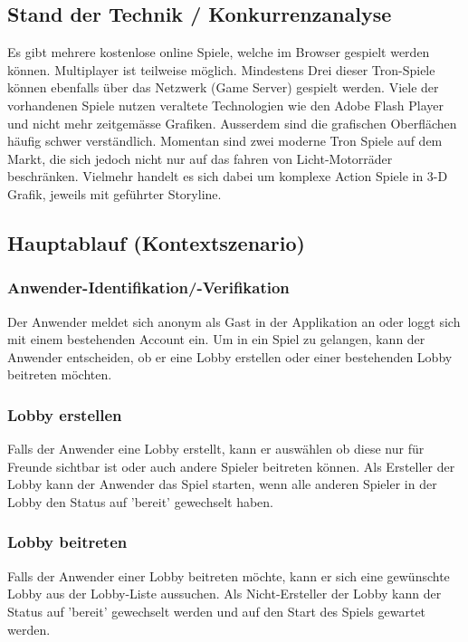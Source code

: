 \documentclass[11pt,ngerman]{article}
\begin{document}
    \subsection{Stand der Technik / Konkurrenzanalyse}
    Es gibt mehrere kostenlose online Spiele, welche im Browser gespielt werden können. \Gls{Multiplayer} ist teilweise möglich. Mindestens Drei dieser Tron-Spiele können ebenfalls über das Netzwerk (\Gls{Game Server}) gespielt werden. \cite{TronGameBasisKostenlosOnline}\cite{sphinxCyclewarsIoOnline}\cite{TronLightCyclesEu}\cite{PlayersOnlineXtremeTron}
    Viele der vorhandenen Spiele nutzen veraltete Technologien wie den \Gls{Adobe Flash Player} \cite{SayingGoodbyeFlash2017}\cite{FlashFutureInteractive2017} und nicht mehr zeitgemässe Grafiken. Ausserdem sind die grafischen Oberflächen häufig schwer verständlich.
    Momentan sind zwei moderne Tron Spiele auf dem Markt, die sich jedoch nicht nur auf das fahren von Licht-Motorräder beschränken. Vielmehr handelt es sich dabei um komplexe Action Spiele in 3-D Grafik, jeweils mit geführter Storyline.\cite{TronEvolution2020}\cite{TRONRUNr}

    \subsection{Hauptablauf (Kontextszenario)}

    \subsubsection{Anwender-Identifikation/-Verifikation}
	Der Anwender meldet sich anonym als Gast in der Applikation an oder loggt sich mit einem bestehenden Account ein. Um in ein Spiel zu gelangen, kann der Anwender entscheiden, ob er eine Lobby erstellen oder einer bestehenden Lobby beitreten möchten.

	\subsubsection{\Gls{Lobby} erstellen}
	Falls der Anwender eine Lobby erstellt, kann er auswählen ob diese nur für Freunde sichtbar ist oder auch andere Spieler beitreten können. Als Ersteller der Lobby kann der Anwender das Spiel starten, wenn alle anderen Spieler in der Lobby den Status auf 'bereit' gewechselt haben.

	\subsubsection{\Gls{Lobby} beitreten}
	Falls der Anwender einer Lobby beitreten möchte, kann er sich eine gewünschte Lobby aus der Lobby-Liste aussuchen. Als Nicht-Ersteller der Lobby kann der Status auf 'bereit' gewechselt werden und auf den Start des Spiels gewartet werden.
\end{document}
